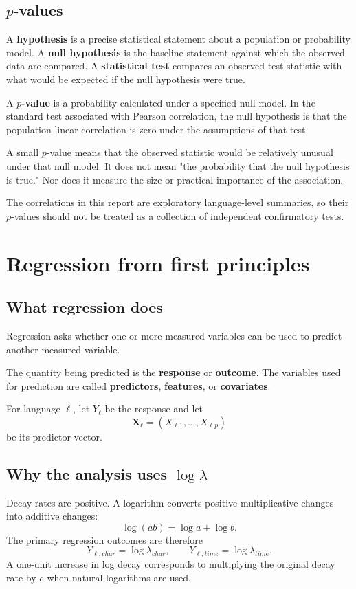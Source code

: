 \documentclass[11pt]{article}
\begin{document}
\subsection{$p$-values}
A \textbf{hypothesis} is a precise statistical statement about a population or probability model. A \textbf{null hypothesis} is the baseline statement against which the observed data are compared. A \textbf{statistical test} compares an observed test statistic with what would be expected if the null hypothesis were true.

A \textbf{$p$-value} is a probability calculated under a specified null model. In the standard test associated with Pearson correlation, the null hypothesis is that the population linear correlation is zero under the assumptions of that test.

A small $p$-value means that the observed statistic would be relatively unusual under that null model. It does not mean "the probability that the null hypothesis is true." Nor does it measure the size or practical importance of the association.

The correlations in this report are exploratory language-level summaries, so their $p$-values should not be treated as a collection of independent confirmatory tests.

\newpage
\section{Regression from first principles}

\subsection{What regression does}
Regression asks whether one or more measured variables can be used to predict another measured variable.

The quantity being predicted is the \textbf{response} or \textbf{outcome}. The variables used for prediction are called \textbf{predictors}, \textbf{features}, or \textbf{covariates}.

For language $\ell$, let $Y_\ell$ be the response and let
\[
\mathbf X_\ell=(X_{\ell1},\ldots,X_{\ell p})
\]
be its predictor vector.

\subsection{Why the analysis uses $\log\lambda$}
Decay rates are positive. A logarithm converts positive multiplicative changes into additive changes:
\[
\log(ab)=\log a+\log b.
\]
The primary regression outcomes are therefore
\[
Y_{\ell,char}=\log\lambda_{char},
\qquad
Y_{\ell,time}=\log\lambda_{time}.
\]
A one-unit increase in log decay corresponds to multiplying the original decay rate by $e$ when natural logarithms are used.
\end{document}

